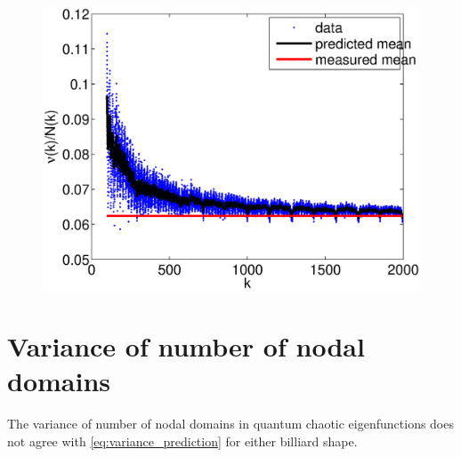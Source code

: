 \documentclass{report}
\begin{document}
\begin{figure}
  \begin{center}
    \includegraphics[width=\textwidth]{figs/results/perc_100_to_2000_mean.eps}
  \end{center}
\end{figure}


\section{Variance of number of nodal domains}
The variance of number of nodal domains in quantum chaotic eigenfunctions does not agree with \ref{eq:variance_prediction} for either billiard shape.
\end{document}

